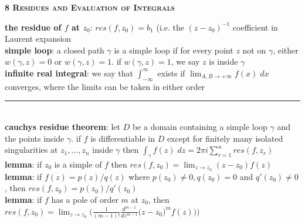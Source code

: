 \documentclass[a4paper]{article}
\newcommand*\linesep[0]{\noindent\rule{\textwidth}{0.5pt}\\}
\begin{document}
\begin{framed}
	\begin{center}
		\textbf{\textsc{8 Residues and Evaluation of Integrals}}
	\end{center}
	\textbf{the residue of $f$ at $z_0$}: $res(f, z_0) = b_1$ (i.e. the $(z - z_0)^{-1}$ coefficient in Laurent expansion\\
	
	\noindent
	\textbf{simple loop}: a closed path $\gamma$ is a simple loop if for every point $z$ not on $\gamma$, either $w(\gamma, z) = 0$ or $w(\gamma, z) = 1$. if $w(\gamma, z) = 1$, we say $z$ is inside $\gamma$\\
	
	\noindent
	\textbf{infinite real integral}: we say that $\int_{-\infty}^\infty$ exists if $\lim_{A,B \rightarrow +\infty} f(x) \; dx$ converges, where the limits can be taken in either order
	
	\linesep
	
	\noindent
	\textbf{cauchys residue theorem}: let $D$ be a domain containing a simple loop $\gamma$ and the points inside $\gamma$. if $f$ is differentiable in $D$ except for finitely many isolated singularities at $z_1, \dots, z_n$ inside $\gamma$ then $\int_\gamma f(z) \; dz = 2 \pi i \sum_{r=1}^n res(f, z_r)$\\
	
	\noindent
	\textbf{lemma}: if $z_0$ is a simple of $f$ then $res(f, z_0) = \lim_{z \rightarrow z_0} (z-z_0)f(z)$\\
	
	\noindent
	\textbf{lemma}: if $f(z) = p(z) / q(z)$ where $p(z_0) \neq 0, q(z_0) = 0$ and $q'(z_0) \neq 0$, then $res(f, z_0) = p(z_0) / q'(z_0)$\\
	
	\noindent
	\textbf{lemma}: if $f$ has a pole of order $m$ at $z_0$, then $res(f, z_0) = \lim_{z \rightarrow z_0}\Big(\frac{1}{(m-1)!}\frac{d^{m-1}}{dz^{m-1}}\big(z-z_0)^mf(z)\big)\Big)$
\end{framed}
\end{document}
